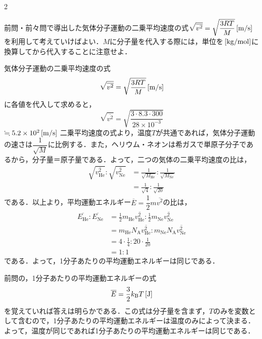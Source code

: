 \begin{multicols}{2}
\par\nopagebreak
\begin{sisin}
前問・前々問で導出した気体分子運動の二乗平均速度の式$\sqrt{\overline{v^2}}=\sqrt{\dfrac{3RT}{M}}\,[\mathrm{m/s}]$を利用して考えていけばよい．$M$に分子量を代入する際には，単位を$\,[\mathrm{kg/mol}]$に換算してから代入することに注意せよ．
\end{sisin}
\KaiHead
\begin{komon}
 気体分子運動の二乗平均速度の式
       \[\sqrt{\overline{v^2}}=\sqrt{\frac{3RT}{M}}\,[\mathrm{m/s}]\]
       に各値を代入して求めると，
       \[\sqrt{\overline{v^2}}=\sqrt{\frac{3\cdot 8.3\cdot 300}{28\times 10^{-3}}}\]
       \hspace*{2zw}$\fallingdotseq 5.2\times 10^2\,[\mathrm{m/s}]$\Ans
{} 二乗平均速度の式より，温度$T$が共通であれば，気体分子運動の速さは$\dfrac{1}{\sqrt{M}}$に比例する．また，ヘリウム・ネオンは希ガスで単原子分子であるから，分子量＝原子量である．よって，二つの気体の二乗平均速度の比は，
       \[\begin{aligned}
         \sqrt{\overline{v_{\mathrm{He}}^2}}:\sqrt{\overline{v_{\mathrm{Ne}}^2}}
         &=\frac{1}{\sqrt{M_{\mathrm{He}}}}:\frac{1}{\sqrt{M_{\mathrm{Ne}}}}\\[1mm]
         &=\frac{1}{\sqrt{4}}:\frac{1}{\sqrt{20}}
       \end{aligned}\]
       である．以上より，平均運動エネルギー$\overline{E}=\dfrac{1}{2}m\overline{v^2}$の比は，
       \[\begin{aligned}
         \overline{E_{\mathrm{He}}}:\overline{E_{\mathrm{Ne}}}
         &=\frac{1}{2}m_{\mathrm{He}}\overline{v_{\mathrm{He}}^2}:\frac{1}{2}m_{\mathrm{Ne}}\overline{v_{\mathrm{Ne}}^2}\\[1mm]
         &=m_{\mathrm{He}}N_{\mathrm{A}}\overline{v_{\mathrm{He}}^2}:m_{\mathrm{Ne}}N_{\mathrm{A}}\overline{v_{\mathrm{Ne}}^2}\\[1mm]
         &=4\cdot\frac{1}{4}:20\cdot\frac{1}{20}\\[1mm]
         &=1:1
       \end{aligned}\]
       である．よって，1分子あたりの平均運動エネルギーは同じである．\Ans
\end{komon}
\begin{bekkai}
前問の，1分子あたりの平均運動エネルギーの式
\[\overline{E}=\frac{3}{2}k_{\mathrm{B}}T\,[\mathrm{J}]\]
を覚えていれば答えは明らかである．この式は分子量を含まず，$T$のみを変数として含むので，1分子あたりの平均運動エネルギーは温度のみによって決まる．よって，温度が同じであれば1分子あたりの平均運動エネルギーは同じである．\par

\end{bekkai}
\end{multicols}
